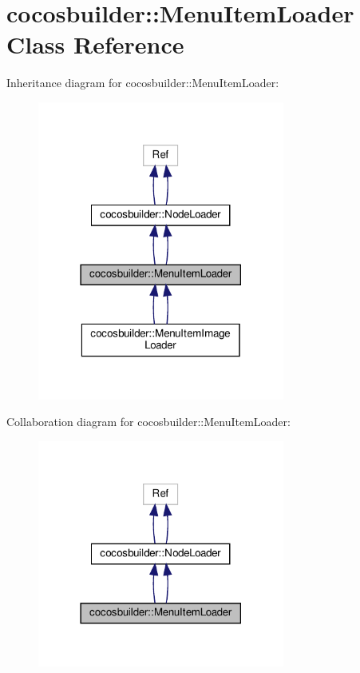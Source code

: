\hypertarget{classcocosbuilder_1_1MenuItemLoader}{}\section{cocosbuilder\+:\+:Menu\+Item\+Loader Class Reference}
\label{classcocosbuilder_1_1MenuItemLoader}


Inheritance diagram for cocosbuilder\+:\+:Menu\+Item\+Loader\+:
\nopagebreak
\begin{figure}[H]
\begin{center}
\leavevmode
\includegraphics[width=230pt]{classcocosbuilder_1_1MenuItemLoader__inherit__graph}
\end{center}
\end{figure}


Collaboration diagram for cocosbuilder\+:\+:Menu\+Item\+Loader\+:
\nopagebreak
\begin{figure}[H]
\begin{center}
\leavevmode
\includegraphics[width=230pt]{classcocosbuilder_1_1MenuItemLoader__coll__graph}
\end{center}
\end{figure}
